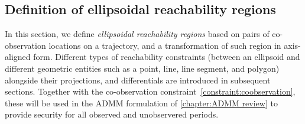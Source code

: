 \documentclass[10pt,twocolumn,twoside]{IEEEtran}
\begin{document}
\subsection{Definition of ellipsoidal reachability regions}\label{sec:reachability}
In this section, we define \emph{ellipsoidal reachability regions} based on pairs of co-observation locations on a trajectory, and a transformation of such region in axis-aligned form. Different types of reachability constraints (between an ellipsoid and different geometric entities such as a point, line, line segment, and polygon) alongside their projections, and differentials are introduced in subsequent sections. Together with the co-observation constraint~\ref{constraint:coobservation}, these will be used in the ADMM formulation of \cref{chapter:ADMM review} to provide security for all observed and unobservered periods.

\end{document}
